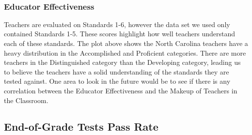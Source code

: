\documentclass[11pt]{article}
\begin{document}
    \begin{center}
    \end{center}
    { \hspace*{\fill} \\}
    
    \subsubsection{Educator Effectiveness}\label{educator-effectiveness}

Teachers are evaluated on Standards 1-6, however the data set we used
only contained Standards 1-5. These scores highlight how well teachers
understand each of these standards. The plot above shows the North
Carolina teachers have a heavy distribution in the Accomplished and
Proficient categories. There are more teachers in the Distinguished
category than the Developing category, leading us to believe the
teachers have a solid understanding of the standards they are tested
against. One area to look in the future would be to see if there is any
correlation between the Educator Effectiveness and the Makeup of
Teachers in the Classroom.

    \subsection{End-of-Grade Tests Pass
Rate}\label{end-of-grade-tests-pass-rate}
\end{document}
